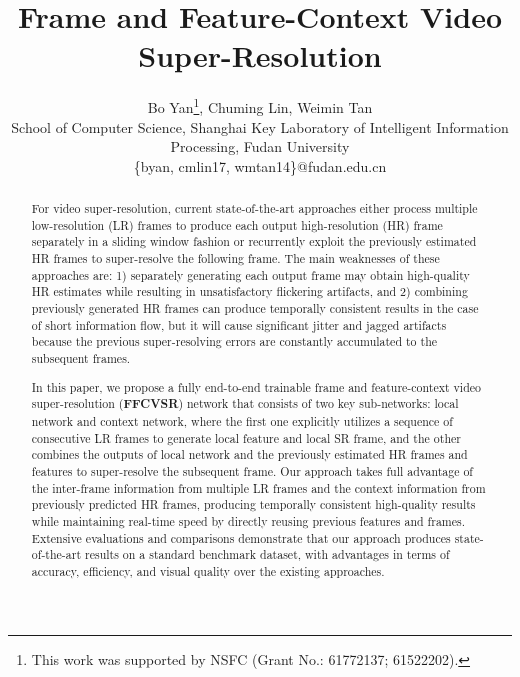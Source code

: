 \documentclass[letterpaper]{article} %
\begin{document}
\title{Frame and Feature-Context Video Super-Resolution}
\author{Bo Yan\thanks{This work was supported by NSFC (Grant No.: 61772137; 61522202).}, Chuming Lin, Weimin Tan\\
School of Computer Science, Shanghai Key Laboratory of Intelligent Information Processing, Fudan University\\
\{byan, cmlin17, wmtan14\}@fudan.edu.cn\\
}
\maketitle
\begin{abstract}
For video super-resolution, current state-of-the-art approaches either process multiple low-resolution (LR) frames to produce each output high-resolution (HR) frame separately in a sliding window fashion or recurrently exploit the previously estimated HR frames to super-resolve the following frame. The main weaknesses of these approaches are: 1) separately generating each output frame may obtain high-quality HR estimates while resulting in unsatisfactory flickering artifacts, and 2) combining previously generated HR frames can produce temporally consistent results in the case of short information flow, but it will cause significant jitter and jagged artifacts because the previous super-resolving errors are constantly accumulated to the subsequent frames.

In this paper, we propose a fully end-to-end trainable frame and feature-context video super-resolution (\textbf{FFCVSR}) network that consists of two key sub-networks: local network and context network, where the first one explicitly utilizes a sequence of consecutive LR frames to generate local feature and local SR frame, and the other combines the outputs of local network and the previously estimated HR frames and features to super-resolve the subsequent frame. Our approach takes full advantage of the inter-frame information from multiple LR frames and the context information from previously predicted HR frames, producing temporally consistent high-quality results while maintaining real-time speed by directly reusing previous features and frames. Extensive evaluations and comparisons demonstrate that our approach produces state-of-the-art results on a standard benchmark dataset, with advantages in terms of accuracy, efficiency, and visual quality over the existing approaches.
\end{abstract}
\end{document}
